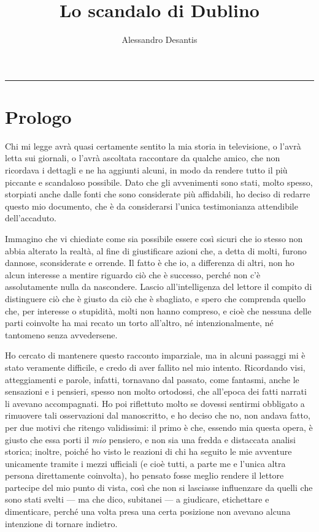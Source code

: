 \documentclass[a4paper,11pt,oneside,openright,final]{memoir}
\title{Lo scandalo di Dublino}
\author{Alessandro Desantis}
\makeatletter
\renewcommand{\maketitle}{\begin{titlingpage}%
    \let\footnotesize\small
    \let\footnoterule\relax
    \parindent \z@
    \reset@font
    \null\vfil
    \begin{flushleft}
      \huge \@title
    \end{flushleft}
    \par
    \hrule height 1pt
    \par
    \begin{flushright}
      \LARGE \@author \par
    \end{flushright}
    \vskip 60\p@
    \vfil\null
  \end{titlingpage}%
  \setcounter{footnote}{0}%
}
\makeatother
\begin{document}
\maketitle

\frontmatter

\chapter{Prologo}
Chi mi legge avrà quasi certamente sentito la mia storia in televisione, o
l'avrà letta sui giornali, o l'avrà ascoltata raccontare da qualche amico, che
non ricordava i dettagli e ne ha aggiunti alcuni, in modo da rendere tutto il
più piccante e scandaloso possibile. Dato che gli avvenimenti sono stati, molto
spesso, storpiati anche dalle fonti che sono considerate più affidabili, ho
deciso di redarre questo mio documento, che è da considerarsi l'unica
testimonianza attendibile dell'accaduto.

Immagino che vi chiediate come sia possibile essere così sicuri che io stesso
non abbia alterato la realtà, al fine di giustificare azioni che, a detta di
molti, furono dannose, sconsiderate e orrende. Il fatto è che io, a differenza
di altri, non ho alcun interesse a mentire riguardo ciò che è successo, perché
non c'è assolutamente nulla da nascondere. Lascio all'intelligenza del lettore
il compito di distinguere ciò che è giusto da ciò che è sbagliato, e spero che
comprenda quello che, per interesse o stupidità, molti non hanno compreso, e
cioè che nessuna delle parti coinvolte ha mai recato un torto all'altro, né
intenzionalmente, né tantomeno senza avvedersene.

Ho cercato di mantenere questo racconto imparziale, ma in alcuni passaggi mi è
stato veramente difficile, e credo di aver fallito nel mio intento. Ricordando
visi, atteggiamenti e parole, infatti, tornavano dal passato, come fantasmi,
anche le sensazioni e i pensieri, spesso non molto ortodossi, che all'epoca dei
fatti narrati li avevano accompagnati. Ho poi riflettuto molto se dovessi
sentirmi obbligato a rimuovere tali osservazioni dal manoscritto, e ho deciso
che no, non andava fatto, per due motivi che ritengo validissimi: il primo è
che, essendo mia questa opera, è giusto che essa porti il \emph{mio} pensiero, e
non sia una fredda e distaccata analisi storica; inoltre, poiché ho visto le
reazioni di chi ha seguito le mie avventure unicamente tramite i mezzi ufficiali
(e cioè tutti, a parte me e l'unica altra persona direttamente coinvolta), ho
pensato fosse meglio rendere il lettore partecipe del mio punto di vista, così
che non si lasciasse influenzare da quelli che sono stati svelti --- ma che
dico, subitanei --- a giudicare, etichettare e dimenticare, perché una volta
presa una certa posizione non avevano alcuna intenzione di tornare indietro.
\end{document}
